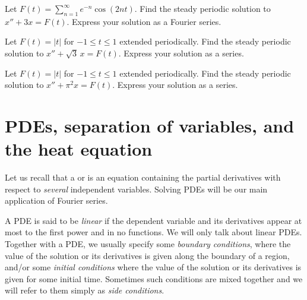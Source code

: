 \documentclass[12pt]{book}
\begin{document}
\begin{exercise}
Let $F(t) = \sum_{n=1}^\infty e^{-n} \cos(2 n t)$.
Find the steady periodic solution to $x'' + 3 x = F(t)$.
Express your solution as a Fourier series.
\end{exercise}

\begin{exercise}
Let $F(t) = \lvert t \rvert$ for $-1 \leq t \leq 1$ extended periodically.
Find the steady periodic solution to $x'' + \sqrt{3}\, x = F(t)$.
Express your solution as a series.
\end{exercise}

\begin{exercise}
Let $F(t) = \lvert t \rvert$ for $-1 \leq t \leq 1$ extended periodically.
Find the steady periodic solution to $x'' + \pi^2 x = F(t)$.
Express your solution as a series.
\end{exercise}



\sectionnewpage
\section{PDEs, separation of variables, and the heat equation}


Let us recall that a \emph{} or
\emph{} is an equation containing the partial derivatives
with respect to \emph{several} independent variables.  Solving PDEs
will be our main application of Fourier series.

A PDE is said to be \emph{linear} if the dependent
variable and its derivatives appear at most to the first power and in no
functions.  We will only talk about linear PDEs.  Together with a PDE,
we usually specify some
\emph{boundary conditions},
where the value of the solution or its derivatives is given along
the boundary of a region, and/or
some 
\emph{initial conditions} where the value
of the solution or its derivatives is given for some initial time.
Sometimes such conditions are mixed together and we will refer to them
simply as 
\emph{side conditions}.
\end{document}
